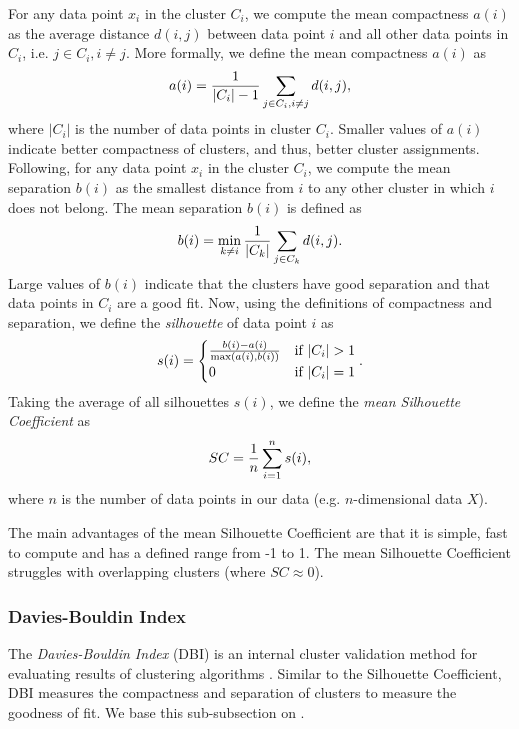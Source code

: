 For any data point $x_i$ in the cluster $C_i$, we compute the mean compactness $a(i)$ as the average distance $d(i, j)$ between data point $i$ and all other data points in $C_i$, i.e. $j \in C_i, i \neq j$. More formally, we define the mean compactness $a(i)$ as
\begin{align}
    a(i) = \frac{1}{|C_i| - 1} \sum\limits_{j \in C_i, i \neq j}^{}{d(i, j)},
    \label{eqn:silhouette-coef-a}
\end{align}
where $|C_i|$ is the number of data points in cluster $C_i$. Smaller values of $a(i)$ indicate better compactness of clusters, and thus, better cluster assignments. Following, for any data point $x_i$ in the cluster $C_i$, we compute the mean separation $b(i)$ as the smallest distance from $i$ to any other cluster in which $i$ does not belong. The mean separation $b(i)$ is defined as
\begin{align}
    b(i) = \min_{k \neq i} \frac{1}{|C_k|} \sum\limits_{j \in C_k}^{}{d(i, j)}.
    \label{eqn:silhouette-coef-b}
\end{align}
Large values of $b(i)$ indicate that the clusters have good separation and that data points in $C_i$ are a good fit. Now, using the definitions of compactness and separation, we define the \textit{silhouette} of data point $i$ as
\begin{align}
    s(i) = \begin{cases}
        \frac{b(i) - a(i)}{\max \left(a(i), b(i)\right)} & \mbox{if } |C_i| > 1 \\
        0 & \mbox{if } |C_i| = 1
    \end{cases}.
\end{align}
Taking the average of all silhouettes $s(i)$, we define the \textit{mean Silhouette Coefficient} as
\begin{align}
    SC = \frac{1}{n} \sum\limits_{i=1}^{n}{s(i)},
    \label{eqn:silhouette-coef}
\end{align}
where $n$ is the number of data points in our data (e.g. $n$-dimensional data $X$).

The main advantages of the mean Silhouette Coefficient are that it is simple, fast to compute and has a defined range from -1 to 1. The mean Silhouette Coefficient struggles with overlapping clusters (where $SC \approx 0$).

\subsubsection{Davies-Bouldin Index}
\label{sec:davies-bouldin-index}
The \textit{Davies-Bouldin Index} (DBI) is an internal cluster validation method for evaluating results of clustering algorithms \cite{DaviesBouldin1979}. Similar to the Silhouette Coefficient, DBI measures the compactness and separation of clusters to measure the goodness of fit. We base this sub-subsection on \cite{DaviesBouldin1979}.

